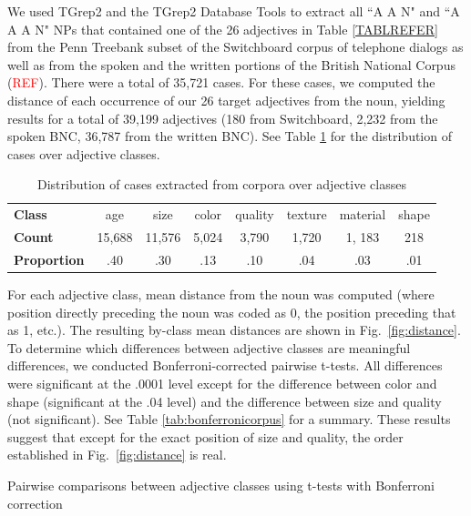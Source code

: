 \documentclass{pnastwo}
\newcommand{\tableref}[1]{Table \ref{#1}}
\newcommand{\figref}[1]{Fig.~\ref{#1}}
\newcommand{\red}[1]{\textcolor{Red}{#1}}
\begin{document}
\begin{article}
\begin{materials}
We used TGrep2 \cite{rohde2005} and the TGrep2 Database Tools \cite{degenjaeger-tdt} to extract all ``A A N" and ``A A A N" NPs that contained one of the 26 adjectives in Table \ref{TABLREFER} from the Penn Treebank subset of the Switchboard corpus of telephone dialogs \cite{godfrey1992} as well as from the spoken and the written portions of the British National Corpus (\red{REF}). There were a total of 35,721 cases. For these cases, we computed the distance of each occurrence of our 26 target adjectives from the noun, yielding results for a total of 39,199 adjectives (180 from Switchboard, 2,232 from the spoken BNC, 36,787 from the written BNC).  See \tableref{tab:adjdist} for the distribution of cases over adjective classes.

\begin{table}
	\caption{Distribution of cases extracted from corpora over adjective classes}
	\begin{tabular}{l c c c c c c c}
	\textbf{Class} & age & size & color & quality & texture & material & shape \\
	\textbf{Count} & 15,688 & 11,576 & 5,024 & 3,790 & 1,720 & 1, 183 & 218 \\
	\textbf{Proportion} & .40 & .30 & .13 & .10 & .04 & .03 & .01
	\end{tabular}
\label{tab:adjdist}
\end{table}


For each adjective class, mean distance from the noun was computed (where position directly preceding the noun was coded as 0, the position preceding that as 1, etc.). The resulting by-class mean distances are shown in \figref{fig:distance}. To determine which differences between adjective classes are meaningful differences, we conducted Bonferroni-corrected pairwise t-tests. All differences were significant at the .0001 level except for the difference between color and shape (significant at the .04 level) and the difference between size and quality (not significant). See \tableref{tab:bonferronicorpus} for a summary. These results suggest that except for the exact position of size and quality, the order established in \figref{fig:distance} is real.

\begin{table}
\caption{Pairwise comparisons between adjective classes using t-tests with Bonferroni correction}


\end{table}
\end{materials}
\end{article}
\end{document}
